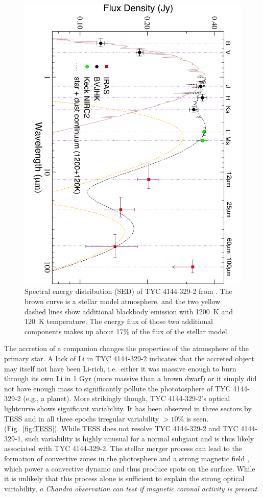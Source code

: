 \documentclass[letterpaper,11pt]{article}
\begin{document}
\begin{figure}
\includegraphics[angle=90,width=.5\textwidth]{SED}
\caption{Spectral energy distribution (SED) of TYC 4144-329-2 from \cite{2009ApJ...696.1964M}. The brown curve is a stellar model atmosphere, and the two yellow dashed lines show additional blackbody emission with 1200~K and 120~K temperature. The energy flux of those two additional components makes up about 17\% of the flux of the stellar model.}
\label{fig:SED}
\end{figure}


The accretion of a companion changes the properties of the atmosphere of the primary star. A lack of Li in TYC 4144-329-2 \cite{2009ApJ...696.1964M} indicates that the accreted object may itself not have been Li-rich, i.e.\ either it was massive enough to burn through its own Li in 1 Gyr (more massive than a brown dwarf) or it simply did not have enough mass to significantly pollute the phototosphere of TYC 4144-329-2 (e.g., a planet). More strikingly though, TYC 4144-329-2's optical lightcurve shows significant variability. It has been observed in three sectors by TESS and in all three epochs irregular variability $>10\%$ is seen. (Fig.~\ref{fig:TESS}). While TESS does not resolve TYC 4144-329-2 and TYC 4144-329-1, such variability is highly unusual for a normal subgiant and is thus likely associated with TYC 4144-329-2. The stellar merger process can lead to the formation of convective zones in the photosphere \cite{Soker&Tylenda2007} and a strong magnetic field \cite{Schneider+2016}, which power a convective dynamo and thus produce spots on the surface. While it is unlikely that this process alone is sufficient to explain the strong optical variability, \textit{a Chandra observation can test if magnetic coronal activity is present.}
\end{document}
